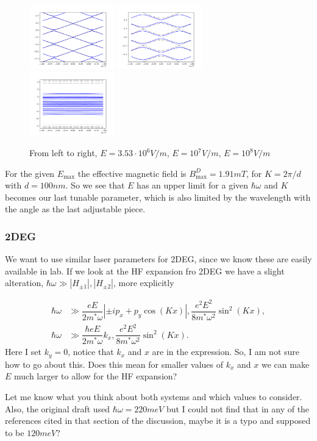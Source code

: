 \documentclass[10pt,letterpaper]{book}
\begin{document}
\begin{figure}[h]
  \includegraphics[width=0.33\textwidth]{./energy-spectrum-matching.pdf}
  \includegraphics[width=0.33\textwidth]{./energy-spectrum-non-matching.pdf}
  \includegraphics[width=0.33\textwidth]{./energy-spectrum-non-matching-2.pdf}
  \caption{From left to right, $E = 3.53\cdot10^6 V/m$, $E=10^7 V/m$, $E=10^8 V/m$}
\end{figure}
For the given $E_{\text{max}}$ the effective magnetic field is $B_{\text{max}}^D = 1.91 mT$, for $K= 2\pi/d$ with $d=100 nm$.
So we see that $E$ has an upper limit for a given $\hbar \omega$ and $K$ becomes our last tunable parameter, which is also limited by the wavelength with the angle as the last adjustable piece.

\subsubsection{2DEG}

We want to use similar laser parameters for 2DEG, since we know these are easily available in lab.
If we look at the HF expansion fro 2DEG we have a slight alteration, $\hbar \omega \gg |H_{\pm1}| , |H_{\pm2}|$, more explicitly

\begin{align}
  \hbar \omega &\gg \dfrac{eE}{2m^* \omega} \left|\pm ip_x + p_y \cos{(Kx)}\right|, \dfrac{e^2 E^2}{8m^* \omega^2} \sin^2{(Kx)}, \nonumber \\
  \hbar \omega &\gg \dfrac{\hbar eE}{2m^* \omega} k_x , \dfrac{e^2 E^2}{8m^* \omega^2} \sin^2{(Kx)}.
\end{align}
Here I set $k_y=0$, notice that $k_x$ and $x$ are in the expression.
So, I am not sure how to go about this.
Does this mean for smaller values of $k_x$ and $x$ we can make $E$ much larger to allow for the HF expansion?

Let me know what you think about both systems and which values to consider.
Also, the original draft used $\hbar\omega=220meV$ but I could not find that in any of the references cited in that section of the discussion, maybe it is a typo and supposed to be $120meV$?
\end{document}
